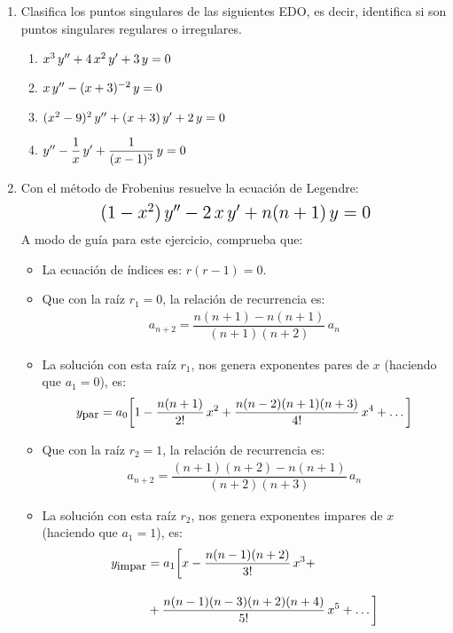 \begin{enumerate}
\item Clasifica los puntos singulares de las siguientes EDO, es decir, identifica si son puntos singulares regulares o irregulares.
\begin{enumerate}
\Large
\item $x^{3} \, {y}^{\prime \prime} + 4 \, x^{2} \, {y}^{\prime} + 3 \, y = 0$
\item $x \, {y}^{\prime \prime} - (x + 3)^{-2} \, y = 0$
\item $(x^{2} - 9)^{2} \, {y}^{\prime \prime} + (x + 3) \, {y}^{\prime} + 2 \, y = 0$
\item ${y}^{\prime \prime} - \dfrac{1}{x} \, {y}^{\prime} + \dfrac{1}{(x - 1)^{3}} \, y = 0$
\end{enumerate}
\item Con el método de Frobenius resuelve la ecuación de Legendre:
\begin{align*}
\mbox{ \Large $
(1 - x^{2}) \, {y}^{\prime \prime} - 2 \, x \, {y}^{\prime} + n (n + 1) \, y = 0$}
\end{align*}
A modo de guía para este ejercicio, comprueba que:
\begin{itemize}
\item La ecuación de índices es: $r (r - 1) = 0$.
\item Que con la raíz $r_{1} = 0$, la relación de recurrencia es:
\begin{align*}
a_{n+2} = \dfrac{n (n + 1) - n (n + 1)}{(n + 1)(n + 2)} \, a_{n}
\end{align*}
\item La solución con esta raíz $r_{1}$, nos genera exponentes pares de $x$ (haciendo que $a_{1} = 0$), es:
\begin{align*}
y_{\mbox{\small{par}}} = a_{0} \bigg[ 1 - \dfrac{n (n + 1)}{2!} \, x^{2} + \dfrac{n (n - 2)(n + 1)(n + 3)}{4!} \, x^{4} + \ldots \bigg]
\end{align*}
\item Que con la raíz $r_{2} = 1$, la relación de recurrencia es:
\begin{align*}
a_{n+2} = \dfrac{(n + 1)(n + 2) - n (n + 1)}{(n + 2)(n + 3)} \, a_{n}
\end{align*}
\item La solución con esta raíz $r_{2}$, nos genera exponentes impares de $x$ (haciendo que $a_{1} = 1$), es:
\begin{align*}
y_{\mbox{\small{impar}}} &= a_{1} \bigg[ x - \dfrac{n (n - 1)(n + 2)}{3!} \, x^{3} + \\[1em]
&+ \dfrac{n (n - 1)(n - 3)(n + 2)(n + 4)}{5!} \, x^{5} + \ldots \bigg]
\end{align*}
\end{itemize}

\end{enumerate}


